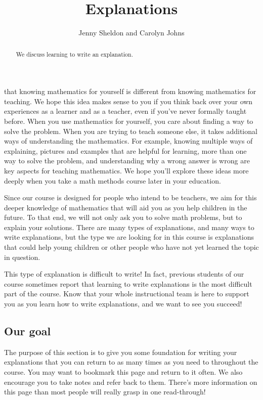 \documentclass[noauthor,nooutcomes]{ximera}
\title{Explanations}
\author{Jenny Sheldon and Carolyn Johns}
\begin{document}
\begin{abstract}
We discuss learning to write an explanation.
\end{abstract}
\maketitle



  that knowing mathematics for yourself is different from knowing mathematics for teaching. We hope this idea makes sense to you if you think back over your own experiences as a learner and as a teacher, even if you've never formally taught before. When you use mathematics for yourself, you care about finding a way to solve the problem. When you are trying to teach someone else, it takes additional ways of understanding the mathematics. For example, knowing multiple ways of explaining, pictures and examples that are helpful for learning, more than one way to solve the problem, and understanding why a wrong answer is wrong are key aspects for teaching mathematics. We hope you'll explore these ideas more deeply when you take a math methods course later in your education.

Since our course is designed for people who intend to be teachers, we aim for this deeper knowledge of mathematics that will aid you as you help children in the future. To that end, we will not only ask you to solve math problems, but to explain your solutions. There are many types of explanations, and many ways to write explanations, but the type we are looking for in this course is explanations that could help young children or other people who have not yet learned the topic in question.

This type of explanation is difficult to write! In fact, previous students of our course sometimes report that learning to write explanations is the most difficult part of the course. Know that your whole instructional team is here to support you as you learn how to write explanations, and we want to see you succeed!

\subsection{Our goal}
The purpose of this section is to give you some foundation for writing your explanations that you can return to as many times as you need to throughout the course. You may want to bookmark this page and return to it often. We also encourage you to take notes and refer back to them. There's more information on this page than most people will really grasp in one read-through!
\end{document}
